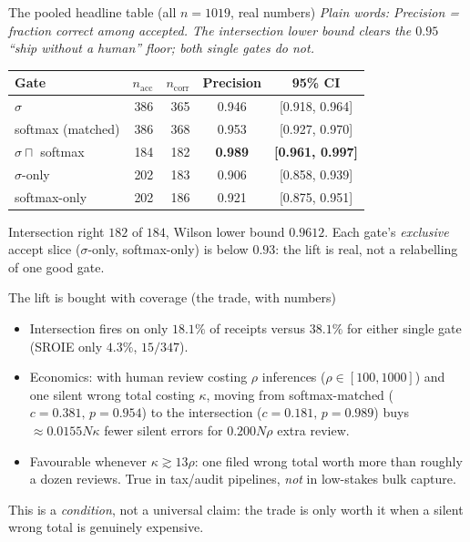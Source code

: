 \documentclass[aspectratio=169]{beamer}
\newcommand{\poolN}{1019}
\newcommand{\poolIntA}{184}
\newcommand{\poolIntC}{182}
\newcommand{\rgPoolWil}{0.9612}
\newcommand{\keybox}[1]{\begin{center}\colorbox{grey!15}{\parbox{0.92\linewidth}{\centering #1}}\end{center}}
\newcommand{\plain}[1]{\textit{\textcolor{sig}{Plain words:} #1}}
\begin{document}
\begin{frame}{The pooled headline table (all $n{=}\poolN$, real numbers)}
\plain{Precision = fraction correct among accepted. The intersection
lower bound clears the $0.95$ ``ship without a human'' floor; both
single gates do not.}
\vspace{0.3em}
\begin{center}\small
\begin{tabular}{lrrcc}
\hline
Gate & $n_{\text{acc}}$ & $n_{\text{corr}}$ & Precision & 95\% CI \\
\hline
$\sigma$ & 386 & 365 & 0.946 & [0.918, 0.964] \\
softmax (matched) & 386 & 368 & 0.953 & [0.927, 0.970] \\
$\sigma\sqcap$ softmax & \poolIntA & \poolIntC &
  \textbf{0.989} & \textbf{[0.961, 0.997]} \\
$\sigma$-only & 202 & 183 & 0.906 & [0.858, 0.939] \\
softmax-only & 202 & 186 & 0.921 & [0.875, 0.951] \\
\hline
\end{tabular}
\end{center}
\vspace{0.3em}
\keybox{Intersection right $\poolIntC$ of $\poolIntA$, Wilson lower
bound \textcolor{ok}{$\rgPoolWil$}. Each gate's \emph{exclusive}
accept slice ($\sigma$-only, softmax-only) is below $0.93$: the lift
is real, not a relabelling of one good gate.}
\end{frame}

\begin{frame}{The lift is bought with coverage (the trade, with numbers)}
\begin{itemize}
\item Intersection fires on only \textbf{$18.1\%$} of receipts versus
\textbf{$38.1\%$} for either single gate (SROIE only $4.3\%$, $15/347$).
\item Economics: with human review costing $\rho$ inferences
($\rho\in[100,1000]$) and one silent wrong total costing $\kappa$,
moving from softmax-matched ($c{=}0.381,\,p{=}0.954$) to the
intersection ($c{=}0.181,\,p{=}0.989$) buys
$\approx 0.0155 N\kappa$ fewer silent errors for $0.200 N\rho$ extra
review.
\item Favourable whenever $\kappa\gtrsim 13\rho$: one filed wrong
total worth more than roughly a dozen reviews. True in tax/audit
pipelines, \emph{not} in low-stakes bulk capture.
\end{itemize}
\keybox{This is a \emph{condition}, not a universal claim: the trade
is only worth it when a silent wrong total is genuinely expensive.}
\end{frame}
\end{document}
